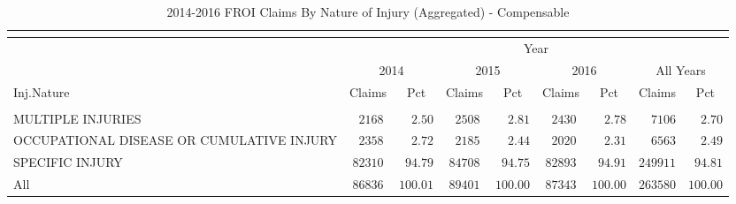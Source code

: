 \documentclass[9pt, oneside]{article}   	%
\begin{document}
\begin{longtable}{lcccccccc}
\caption{2014-2016 FROI Claims By Nature of Injury (Aggregated) - Compensable}\\ 
\label{Table: Injuries} \\
\hline

                  \toprule
 & \multicolumn{8}{c}{Year} \\ 
 & \multicolumn{2}{c}{2014} & \multicolumn{2}{c}{2015} & \multicolumn{2}{c}{2016} & \multicolumn{2}{c}{All Years} \\ 
Inj.Nature  & Claims & Pct & Claims & Pct & Claims & Pct & Claims & \multicolumn{1}{c}{Pct} \\ 
\midrule\\ [-1\normalbaselineskip]\hline\endhead\hline\endfoot
MULTIPLE INJURIES  & $\phantom{0}2168$ & $\phantom{00}2.50$ & $\phantom{0}2508$ & $\phantom{00}2.81$ & $\phantom{0}2430$ & $\phantom{00}2.78$ & $\phantom{00}7106$ & $\phantom{00}2.70$ \\
OCCUPATIONAL DISEASE OR CUMULATIVE INJURY  & $\phantom{0}2358$ & $\phantom{00}2.72$ & $\phantom{0}2185$ & $\phantom{00}2.44$ & $\phantom{0}2020$ & $\phantom{00}2.31$ & $\phantom{00}6563$ & $\phantom{00}2.49$ \\
SPECIFIC INJURY  & $82310$ & $\phantom{0}94.79$ & $84708$ & $\phantom{0}94.75$ & $82893$ & $\phantom{0}94.91$ & $249911$ & $\phantom{0}94.81$ \\
\cline{1-1} \cline{2-2} \cline{3-3} \cline{4-4} \cline{5-5} \cline{6-6} \cline{7-7}  \cline{8-8} \cline{9-9} %
All  & $86836$ & $100.01$ & $89401$ & $100.00$ & $87343$ & $100.00$ & $263580$ & $100.00$ \\
\hline 
\end{longtable}

      
\pagebreak   















   
\end{document}
